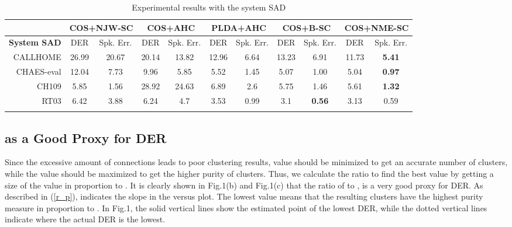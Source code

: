 \documentclass[journal]{IEEEtran}
\begin{document}
\begin{table*}[t]
\caption{Experimental results with the system SAD}
\vspace{-1.4ex}
\small
\centering
 \begin{tabular}{ r | c c | c c | c c | c c | c c } 
 \Xhline{3\arrayrulewidth}
 \label{tab:system_SAD}
 & \multicolumn{2}{c}{ COS+NJW-SC } & \multicolumn{2}{c}{ COS+AHC } & \multicolumn{2}{c}{ PLDA+AHC } & \multicolumn{2}{c}{COS+B-SC} & \multicolumn{2}{c}{ COS+NME-SC } \\
 \hline
\textbf{System SAD} & DER & Spk. Err. & DER & Spk. Err. & DER & Spk. Err. & DER & Spk. Err. & DER & Spk. Err. \\
\Xhline{3\arrayrulewidth}
 CALLHOME & 26.99 & 20.67 & 20.14 & 13.82 & 12.96 & 6.64 & 13.23 & 6.91 & 11.73 & \textbf{5.41} \\ 
CHAES-eval& 12.04 & 7.73 & 9.96  & 5.85 & 5.52 & 1.45 & 5.07 & 1.00 & 5.04 & \textbf{0.97} \\
CH109 & 5.85 & 1.56 & 28.92 & 24.63 & 6.89 & 2.6 & 5.75 & 1.46 & 5.61 & \textbf{1.32} \\
 
RT03 & 6.42 & 3.88 & 6.24 & 4.7 &   3.53 & 0.99 & 3.1 & \textbf{0.56} & 3.13 & 0.59  \\


\Xhline{3\arrayrulewidth}
\end{tabular}
\vspace{-2.0ex}
\end{table*}

\vspace{-2.0ex}
\subsection{ as a Good Proxy for DER}
Since the excessive amount of connections leads to poor clustering results,  value should be minimized to get an accurate number of clusters, while the  value should be maximized to get the higher purity of clusters. Thus, we calculate the ratio  to find the best  value by getting a size of the  value in proportion to . It is clearly shown in Fig.1(b) and Fig.1(c) that the ratio of  to ,  is a very good proxy for DER. As described in (\ref{r_p}),   indicates the slope in the  versus  plot. The lowest  value means that the resulting clusters have the highest purity measure  in proportion to . In Fig.1, the solid vertical lines show the estimated point of the lowest DER, while the dotted vertical lines indicate where the actual DER is the lowest.
\end{document}
